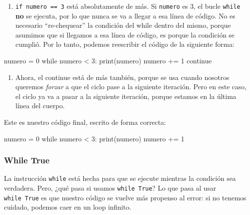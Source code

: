 \documentclass[
  letterpaper,
  DIV=11,
  numbers=noendperiod]{scrreprt}
\newenvironment{Shaded}{\begin{snugshade}}{\end{snugshade}}
\newcommand{\BuiltInTok}[1]{\textcolor[rgb]{0.00,0.23,0.31}{#1}}
\newcommand{\ControlFlowTok}[1]{\textcolor[rgb]{0.00,0.23,0.31}{#1}}
\newcommand{\DecValTok}[1]{\textcolor[rgb]{0.68,0.00,0.00}{#1}}
\newcommand{\NormalTok}[1]{\textcolor[rgb]{0.00,0.23,0.31}{#1}}
\newcommand{\OperatorTok}[1]{\textcolor[rgb]{0.37,0.37,0.37}{#1}}
\providecommand{\tightlist}{%
  \setlength{\itemsep}{0pt}\setlength{\parskip}{0pt}}\usepackage{longtable,booktabs,array}
\begin{document}
\begin{enumerate}
\def\labelenumi{\arabic{enumi}.}
\tightlist
\item
  \texttt{if\ numero\ ==\ 3} está absolutamente de más. Si
  \texttt{numero} es 3, el bucle \texttt{while} \textbf{no} se ejecuta,
  por lo que nunca se va a llegar a esa línea de código. No es necesario
  ``re-chequear'' la condición del while dentro del mismo, porque
  asumimos que si llegamos a esa línea de código, es porque la condición
  se cumplió. Por lo tanto, podemos reescribir el código de la siguiente
  forma:
\end{enumerate}

\begin{Shaded}
\begin{Highlighting}[]
\NormalTok{numero }\OperatorTok{=} \DecValTok{0} 
\ControlFlowTok{while}\NormalTok{ numero }\OperatorTok{\textless{}} \DecValTok{3}\NormalTok{:}
  \BuiltInTok{print}\NormalTok{(numero)}
\NormalTok{  numero }\OperatorTok{+=} \DecValTok{1}
  \ControlFlowTok{continue}
\end{Highlighting}
\end{Shaded}

\begin{enumerate}
\def\labelenumi{\arabic{enumi}.}
\setcounter{enumi}{1}
\tightlist
\item
  Ahora, el continue está de más también, porque se usa cuando nosotros
  queremos \emph{forzar} a que el ciclo pase a la siguiente iteración.
  Pero en este caso, el ciclo ya va a pasar a la siguiente iteración,
  porque estamos en la última línea del cuerpo.
\end{enumerate}

Este es nuestro código final, escrito de forma correcta:

\begin{Shaded}
\begin{Highlighting}[]
\NormalTok{numero }\OperatorTok{=} \DecValTok{0} 
\ControlFlowTok{while}\NormalTok{ numero }\OperatorTok{\textless{}} \DecValTok{3}\NormalTok{:}
  \BuiltInTok{print}\NormalTok{(numero)}
\NormalTok{  numero }\OperatorTok{+=} \DecValTok{1}
\end{Highlighting}
\end{Shaded}

\subsubsection{While True}\label{while-true}

La instrucción \texttt{while} está hecha para que se ejecute mientras la
condición sea verdadera. Pero, ¿qué pasa si usamos \texttt{while\ True}?
Lo que pasa al usar \texttt{while\ True} es que nuestro código se vuelve
más propenso al error: si no tenemos cuidado, podemos caer en un loop
infinito.\\
\end{document}
